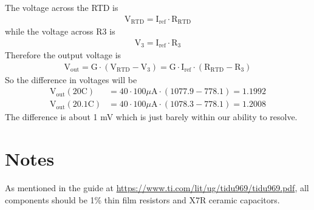 \documentclass[12pt,openright,twoside]{report}
\begin{document}
The voltage across the RTD is
\begin{align}
\mathrm{V}_\mathrm{RTD} = \mathrm{I}_\mathrm{ref}\cdot\mathrm{R}_\mathrm{RTD}
\end{align}
while the voltage across R3 is
\begin{align}
\mathrm{V}_\mathrm{3} = \mathrm{I}_\mathrm{ref}\cdot\mathrm{R}_\mathrm{3}
\end{align}
Therefore the output voltage is
\begin{align}
\mathrm{V}_\mathrm{out} = \mathrm{G}\cdot\left(\mathrm{V}_\mathrm{RTD}-\mathrm{V}_3\right) = \mathrm{G}\cdot\mathrm{I}_\mathrm{ref}\cdot\left(\mathrm{R}_\mathrm{RTD} - \mathrm{R}_\mathrm{3}\right)
\end{align}
So the difference in voltages will be
\begin{align}
\mathrm{V}_\mathrm{out}(20 \mathrm{C}) &= 40 \cdot 100 \mu \mathrm{A} \cdot \left(1077.9 - 778.1\right) = 1.1992 \\
\mathrm{V}_\mathrm{out}(20.1 \mathrm{C}) &= 40 \cdot 100 \mu \mathrm{A} \cdot \left(1078.3 - 778.1\right) = 1.2008
\end{align}
The difference is about 1 mV which is just barely within our ability to resolve.
\section{Notes}
As mentioned in the guide at \url{https://www.ti.com/lit/ug/tidu969/tidu969.pdf}, all components should be 1\% thin film resistors and X7R ceramic capacitors.
\end{document}
